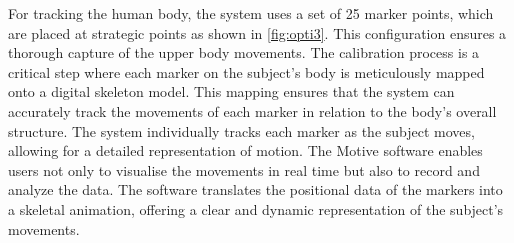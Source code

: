 For tracking the human body, the system uses a set of 25 marker points, which are placed at strategic points as shown in {\autoref{fig:opti3}}. This configuration ensures a thorough capture of the upper body movements. The calibration process is a critical step where each marker on the subject's body is meticulously mapped onto a digital skeleton model. This mapping ensures that the system can accurately track the movements of each marker in relation to the body's overall structure. The system individually tracks each marker as the subject moves, allowing for a detailed representation of motion.
The Motive software enables users not only to visualise the movements in real time but also to record and analyze the data. The software translates the positional data of the markers into a skeletal animation, offering a clear and dynamic representation of the subject's movements.

